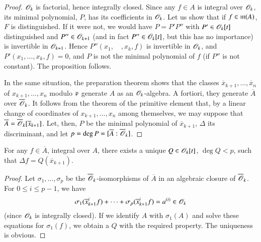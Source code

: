 \begin{proof}
$\mathscr{O}_{k}$ is factorial, hence integrally closed. Since any $f\in A$ is integral over $\mathscr{O}_{k}$, its minimal polynomial, $P$, has its coefficients in $\mathscr{O}_{k}$. Let us show that if $f\in \mathfrak{m}(A)$, $F$ is distinguished. If it were not, we would have $P=P'P''$ with $P'\in \mathscr{O}_{k}[t]$ distinguished and $P''\in \mathscr{O}_{k+1}$ (and in fact $P''\in \mathscr{O}_{k}[t]$, but this has no importance) is invertible in $\mathscr{O}_{k+1}$. Hence $P''(x_{1},\quad,x_{k},f)$ is invertible in $\mathscr{O}_{k}$, and $P'(x_{1},\ldots,x_{k},f)=0$, and $P$ is not the minimal polynomial of $f$ (if $P''$ is not constant). The proposition follows.

In the same situation, the preparation theorem shows that the classes $\overline{x}_{k+1},\ldots,\overline{x}_{n}$ of $x_{k+1},\ldots,x_{n}$ modulo $\mathfrak{p}$ generate $A$ as an $\mathscr{O}_{k}$-algebra. A fortiori, they generate $\overline{A}$ over $\overline{\mathscr{O}}_{k}$. It follows from the theorem of the primitive element that, by a linear change of coordinates of $x_{k+1},\ldots,x_{n}$ among themselves, we may suppose that $\overline{A}=\overline{\mathscr{O}}_{k}[\overline{x}_{k+1}]$. Let, then, $P$ be the minimal polynomial of $\overline{x}_{k+1}$, $\Delta$ its discriminant, and let $p=\deg P=[\overline{A}:\overline{\mathscr{O}}_{k}]$.
\end{proof}

\begin{proposition}\label{chap3-prop5.7}
For any $f\in \overline{A}$, integral over $A$, there exists a unique $Q\in \mathscr{O}_{k}[t]$, $\deg Q<p$, such that $\Delta f=Q(\overline{x}_{k+1})$.
\end{proposition}

\begin{proof}
Let $\sigma_{1},\ldots,\sigma_{p}$ be the $\overline{\mathscr{O}}_{k}$-isomorphisms of $\overline{A}$ in an algebraic closure of $\overline{\mathscr{O}}_{k}$. For $0\leq i\leq p-1$, we have
$$
\sigma_{1}(\overline{x}^{i}_{k+1}f)+\cdots+\sigma_{p}(\overline{x}^{i}_{k+1}f)=a^{(i)}\in \mathscr{O}_{k}
$$
(since $\mathscr{O}_{k}$ is integrally closed). If we identify $A$ with $\sigma_{1}(A)$ and solve these equations for $\sigma_{1}(f)$, we obtain a $Q$ with the required property. The uniqueness is obvious.
\end{proof}

